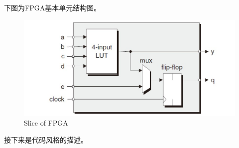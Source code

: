 下图为FPGA基本单元结构图。
\begin{figure}[H] %
    \centering
    \includegraphics{img/FPGA.jpg}
    \caption{Slice of FPGA} %
    \label{图1} %
\end{figure}
接下来是代码风格的描述。